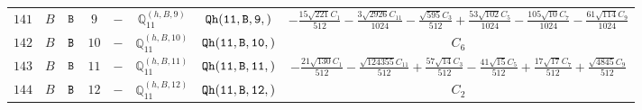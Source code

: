 \documentclass[fleqn,8pt]{jsarticle}
\begin{document}
\begin{table}[ht!]
\begin{center}
\begin{tabular}{cccccccc}
$ 141 $ & $ B $ & $ {\tt B} $ & $ 9 $ & $ - $ & $ \mathbb{Q}_{11}^{(h,B,9)} $ & $ {\tt Qh(11,B,9,)} $ & $ - \frac{15 \sqrt{221} C_{1}}{512} - \frac{3 \sqrt{2926} C_{11}}{1024} - \frac{\sqrt{595} C_{3}}{512} + \frac{53 \sqrt{102} C_{5}}{1024} - \frac{105 \sqrt{10} C_{7}}{1024} - \frac{61 \sqrt{114} C_{9}}{1024} $ \\
$ 142 $ & $ B $ & $ {\tt B} $ & $ 10 $ & $ - $ & $ \mathbb{Q}_{11}^{(h,B,10)} $ & $ {\tt Qh(11,B,10,)} $ & $ C_{6} $ \\
$ 143 $ & $ B $ & $ {\tt B} $ & $ 11 $ & $ - $ & $ \mathbb{Q}_{11}^{(h,B,11)} $ & $ {\tt Qh(11,B,11,)} $ & $ - \frac{21 \sqrt{130} C_{1}}{512} - \frac{\sqrt{124355} C_{11}}{512} + \frac{57 \sqrt{14} C_{3}}{512} - \frac{41 \sqrt{15} C_{5}}{512} + \frac{17 \sqrt{17} C_{7}}{512} + \frac{\sqrt{4845} C_{9}}{512} $ \\
$ 144 $ & $ B $ & $ {\tt B} $ & $ 12 $ & $ - $ & $ \mathbb{Q}_{11}^{(h,B,12)} $ & $ {\tt Qh(11,B,12,)} $ & $ C_{2} $ \\
 \hline \hline
\end{tabular}
\end{center}
\end{table}
\end{document}
